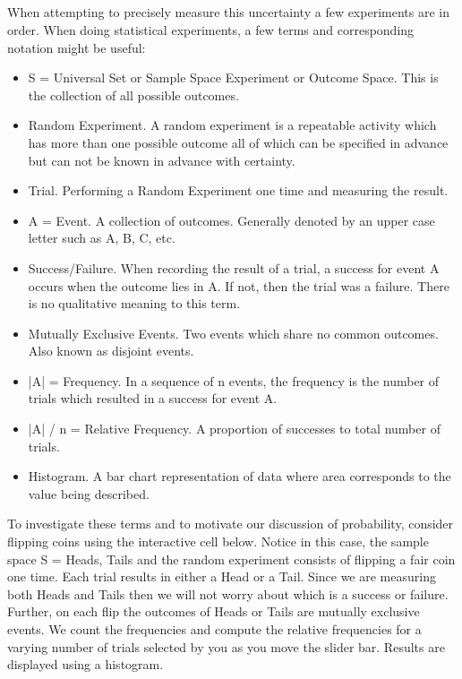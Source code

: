\documentclass[10pt,]{book}
\theoremstyle{plain}
\theoremstyle{definition}
\theoremstyle{definition}
\numberwithin{equation}{section}
\begin{document}
\subsection[]{}\label{subsection-7}
When attempting to precisely measure this uncertainty a few experiments are in order. When doing statistical experiments, a few terms and corresponding notation might be useful:%
\leavevmode%
\begin{itemize}[label=\textbullet]
\item{}S = Universal Set or Sample Space Experiment or Outcome Space. 
		This is the collection of all possible outcomes.%
\item{}Random Experiment. A random experiment is a repeatable activity which has more than one
		possible outcome all of which can be specified in advance but can not be known in advance with certainty.%
\item{}Trial. Performing a Random Experiment one time and measuring the result.%
\item{}A = Event. A collection of outcomes.  Generally denoted by an upper case letter such as A, B, C, etc.%
\item{}Success/Failure. When recording the result of a trial, a success for event A occurs when the outcome
		lies in A. If not, then the trial was a failure. There is no qualitative meaning to this term.%
\item{}Mutually Exclusive Events. Two events which share no common outcomes. Also known as disjoint events.%
\item{}|A| = Frequency. In a sequence of n events, the frequency is the number of trials which resulted in 
		a success for event A.%
\item{}|A| / n = Relative Frequency. A proportion of successes to total number of trials.%
\item{}Histogram. A bar chart representation of data where area corresponds to the value being described.%
\end{itemize}
\par
To investigate these terms and to motivate our discussion of probability, consider flipping coins using the
interactive cell below. Notice in this case, the sample space S = {Heads, Tails} and the random experiment consists
of flipping a fair coin one time. Each trial results in either a Head or a Tail. Since we are measuring both Heads
and Tails then we will not worry about which is a success or failure. Further, on each flip the outcomes of Heads
or Tails are mutually exclusive events. We count the frequencies and compute the relative frequencies for a varying
number of trials selected by you as you move the slider bar. Results are displayed using a histogram.%
\par
\end{document}
